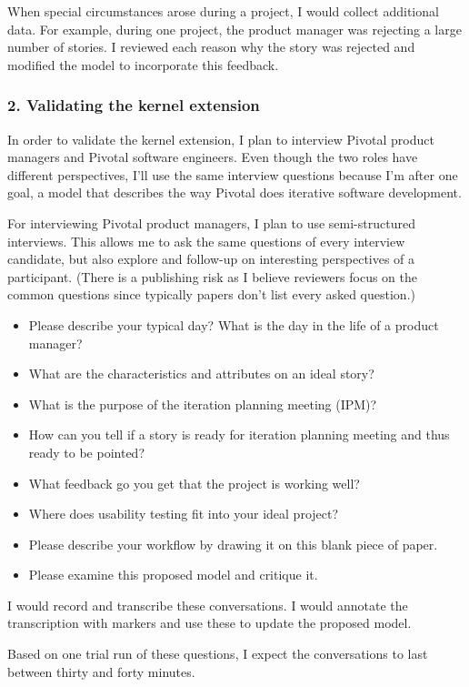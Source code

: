 \documentclass[preprint,12pt,3p]{elsarticle}
\begin{document}
{When special circumstances arose during a project, I would collect additional data. For example, during one project, the product manager was rejecting a large number of stories. I reviewed each reason why the story was rejected and modified the model to incorporate this feedback.

\subsubsection{2. Validating the kernel extension}

In order to validate the kernel extension, I plan to interview Pivotal product managers and Pivotal software engineers. Even though the two roles have different perspectives, I'll use the same interview questions because I'm after one goal, a model that describes the way Pivotal does iterative software development.

For interviewing Pivotal product managers, I plan to use semi-structured interviews. This allows me to ask the same questions of every interview candidate, but also explore and follow-up on interesting perspectives of a participant. (There is a publishing risk as I believe reviewers focus on the common questions since typically papers don't list every asked question.)

\begin{itemize}
\item Please describe your typical day? What is the day in the life of a product manager?
\item What are the characteristics and attributes on an ideal story?
\item What is the purpose of the iteration planning meeting (IPM)?
\item How can you tell if a story is ready for iteration planning meeting and thus ready to be pointed?
\item What feedback go you get that the project is working well?
\item Where does usability testing fit into your ideal project?
\item Please describe your workflow by drawing it on this blank piece of paper.
\item Please examine this proposed model and critique it.
\end{itemize}

I would record and transcribe these conversations. I would annotate the transcription with markers and use these to update the proposed model.

Based on one trial run of these questions, I expect the conversations to last between thirty and forty minutes. 

}
\end{document}
